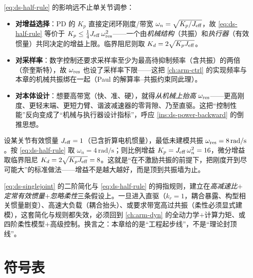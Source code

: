 \begin{insight}[这条天花板把整本控制部串了起来]
\label{ins:ds-bandwidth-ceiling}
\cref{eq:ds-half-rule} 的影响远不止单关节调参：
\begin{itemize}
  \item \textbf{对增益选择}：PD 的 $K_p$ 直接定闭环刚度/带宽 $\omega_n=\sqrt{K_p/J_{\rm eff}}$，故 \cref{eq:ds-half-rule} 等价于 $K_p\le\tfrac14 J_{\rm eff}\,\omega_{\rm res}^2$——一个由\emph{机械结构}（共振）和\emph{执行器}（有效惯量）共同决定的增益上限。临界阻尼则取 $K_d=2\sqrt{K_p J_{\rm eff}}$。
  \item \textbf{对采样率}：数字控制还要求采样率至少为最高待抑制频率（含共振）的两倍（奈奎斯特），故 $\omega_{\rm res}$ 也设了采样率下限——这把 \cref{ch:arm-ctrl} 的实现频率与本章的机械共振绑在一起（Paul 的解算率--共振约束同此理）。
  \item \textbf{对本体设计}：想要高带宽（快、准、硬），就得\emph{从机械上抬高} $\omega_{\rm res}$——更高刚度、更轻末端、更短力臂、谐波减速器的零背隙、乃至直驱。这把“控制性能”反向变成了“机械与执行器设计指标”，呼应 \cref{ins:ds-power-backward} 的倒推思想。
\end{itemize}
\end{insight}

\begin{example}[把规则用到一次增益整定]
\label{ex:ds-gain-tuning}
设某关节有效惯量 $J_{\rm eff}=1$（已含折算电机惯量），最低未建模共振 $\omega_{\rm res}=8\,\mathrm{rad/s}$。按 \cref{eq:ds-half-rule} 取 $\omega_n=4\,\mathrm{rad/s}$；则比例增益 $K_p=J_{\rm eff}\,\omega_n^2=16$，微分增益取临界阻尼 $K_d=2\sqrt{K_p J_{\rm eff}}=8$。这就是“在不激励共振的前提下，把刚度开到尽可能大”的标准做法——增益不是越大越好，而是顶到共振墙为止。
\end{example}

\begin{pitfall}
\cref{eq:ds-singlejoint} 的二阶简化与 \cref{eq:ds-half-rule} 的拇指规则，建立在\emph{高减速比$+$定常有效惯量$+$忽略柔性}三条假设上。一旦进入直驱（$k_r=1$，耦合暴露、构型相关惯量剧变）、高速大负载（耦合抬头）、或要求带宽高过共振（柔性必须显式建模），这套简化与规则都失效，必须回到 \cref{ch:arm-dyn} 的全动力学$+$计算力矩、或四阶柔性模型$+$高级控制。换言之：本章给的是“工程起步线”，不是“理论封顶线”。
\end{pitfall}

\section{符号表}
\label{sec:ds-notation}

